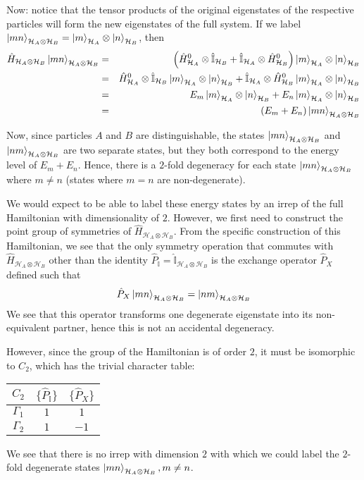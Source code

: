 \documentclass[12pt]{article}
\begin{document}
	Now: notice that the tensor products of the original eigenstates of the respective particles will form the new eigenstates of the full system. If we label $\ket{mn}_{\mathcal{H}_A\otimes\mathcal{H}_B}=\ket{m}_{\mathcal{H}_A}\otimes\ket{n}_{\mathcal{H}_B}$, then
	\begin{eqnarray*}
	\hat{H}_{\mathcal{H}_A\otimes\mathcal{H}_B} \ket{mn}_{\mathcal{H}_A\otimes\mathcal{H}_B} &=& \left(\hat{H}^0_{\mathcal{H}_A} \otimes \hat{\mathbb{I}}_{\mathcal{H}_B}+\hat{\mathbb{I}}_{\mathcal{H}_A} \otimes \hat{H}^0_{\mathcal{H}_B}\right) \ket{m}_{\mathcal{H}_A}\otimes\ket{n}_{\mathcal{H}_B}\\
	&=& \hat{H}^0_{\mathcal{H}_A} \otimes \hat{\mathbb{I}}_{\mathcal{H}_B} \ket{m}_{\mathcal{H}_A}\otimes\ket{n}_{\mathcal{H}_B} + \hat{\mathbb{I}}_{\mathcal{H}_A} \otimes \hat{H}^0_{\mathcal{H}_B} \ket{m}_{\mathcal{H}_A}\otimes\ket{n}_{\mathcal{H}_B}\\
	&=& E_m \ket{m}_{\mathcal{H}_A}\otimes\ket{n}_{\mathcal{H}_B} + E_n \ket{m}_{\mathcal{H}_A}\otimes\ket{n}_{\mathcal{H}_B}\\
	&=& (E_m + E_n) \ket{mn}_{\mathcal{H}_A\otimes\mathcal{H}_B}
	\end{eqnarray*}
	
	Now, since particles $A$ and $B$ are distinguishable, the states $\ket{mn}_{\mathcal{H}_A\otimes\mathcal{H}_B}$ and $\ket{nm}_{\mathcal{H}_A\otimes\mathcal{H}_B}$ are two separate states, but they both correspond to the energy level of $E_m+E_n$. Hence, there is a $2$-fold degeneracy for each state $\ket{mn}_{\mathcal{H}_A\otimes\mathcal{H}_B}$ where $m\neq n$ (states where $m=n$ are non-degenerate).
	
	We would expect to be able to label these energy states by an irrep of the full Hamiltonian with dimensionality of $2$. However, we first need to construct the point group of symmetries of $\hat{H}_{\mathcal{H}_A\otimes\mathcal{H}_B}$. From the specific construction of this Hamiltonian, we see that the only symmetry operation that commutes with $\hat{H}_{\mathcal{H}_A\otimes\mathcal{H}_B}$ other than the identity $\hat{P}_\mathbb{I}=\hat{\mathbb{I}}_{\mathcal{H}_A\otimes\mathcal{H}_B}$ is the exchange operator $\hat{P}_X$ defined such that
	$$\hat{P}_X \ket{mn}_{\mathcal{H}_A\otimes\mathcal{H}_B} = \ket{nm}_{\mathcal{H}_A\otimes\mathcal{H}_B}$$
	We see that this operator transforms one degenerate eigenstate into its non-equivalent partner, hence this is not an accidental degeneracy.
	
	However, since the group of the Hamiltonian is of order $2$, it must be isomorphic to $C_2$, which has the trivial character table:
	\begin{center}
	\begin{tabular}{c | c c}
	$C_2$ & $\{\hat{P}_{\mathbb{I}}\}$ & $\{\hat{P}_X\}$ \\
	\hline
	$\Gamma_1$ & $1$ & $1$\\
	$\Gamma_2$ & $1$ & $-1$
	\end{tabular}
	\end{center}
	
	We see that there is no irrep with dimension $2$ with which we could label the $2$-fold degenerate states $\ket{mn}_{\mathcal{H}_A\otimes\mathcal{H}_B}, m\neq n$.
	
\end{document}
